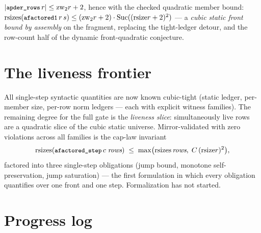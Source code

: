 \documentclass[11pt]{article}
\newcommand{\rsize}{\mathrm{rsize}}
\newcommand{\rsizes}{\mathrm{rsizes}}
\newcommand{\zw}{\mathrm{zw}}
\newcommand{\code}[1]{\texttt{\small #1}}
\begin{document}
$|\code{apder\_rows}\,r| \le \zw_2 r + 2$, hence with the checked quadratic
member bound: $\rsizes(\code{afactored1}\,r\,s) \le (\zw_2 r + 2) \cdot
\mathrm{Suc}((\rsize r+2)^2)$ --- a \emph{cubic static front bound by
assembly} on the fragment, replacing the tight-ledger detour, and the
row-count half of the dynamic front-quadratic conjecture.

\section{The liveness frontier}

All single-step syntactic quantities are now known cubic-tight
(static ledger, per-member size, per-row norm ledgers --- each with explicit
witness families).  The remaining degree for the full gate is the
\emph{liveness slice}: simultaneously live rows are a quadratic slice of the
cubic static universe.  Mirror-validated with zero violations across all
families is the cap-law invariant
\[
\rsizes(\code{afactored\_step}\,c\;\textit{rows}) \;\le\;
\max\bigl(\rsizes\,\textit{rows},\; C\,(\rsize r)^2\bigr),
\]
factored into three single-step obligations (jump bound, monotone
self-preservation, jump saturation) --- the first formulation in which every
obligation quantifies over one front and one step.  Formalization has not
started.

\section{Progress log}
\end{document}

